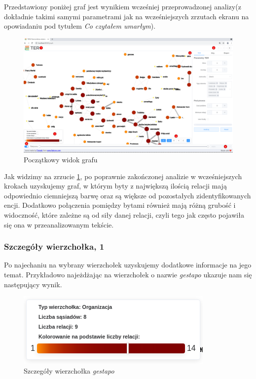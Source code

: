 \documentclass[12pt, a4paper]{article}
\begin{document}
Przedstawiony poniżej graf jest wynikiem wcześniej przeprowadzonej analizy(z dokładnie takimi samymi parametrami jak na wcześniejszych zrzutach ekranu na opowiadaniu pod tytułem \textit{Co czytałem umarłym}).

\begin{figure}[H]
    \centering
    \includegraphics[width=\linewidth]{images/graf-main.png}
    \caption{Początkowy widok grafu}
    \label{graf-main}
\end{figure}

Jak widzimy na zrzucie \ref{graf-main}, po poprawnie zakończonej analizie w wcześniejszych krokach uzyskujemy graf, w którym byty z największą ilością relacji mają odpowiednio ciemniejszą barwę oraz są większe od pozostałych zidentyfikowanych encji. Dodatkowo połączenia pomiędzy bytami również mają różną grubość i widoczność, które zależne są od siły danej relacji, czyli tego jak często pojawiła się ona w przeanalizowanym tekście.\\

\subsubsection{Szczegóły wierzchołka, 1}

Po najechaniu na wybrany wierzchołek uzyskujemy dodatkowe informacje na jego temat. Przykładowo najeżdżając na wierzchołek o nazwie \textit{gestapo} ukazuje nam się następujący wynik.

\begin{figure}[H]
    \centering
    \includegraphics[width=\linewidth]{images/graph-gestapo.png}
    \caption{Szczegóły wierzchołka \textit{gestapo}}
\end{figure}
\end{document}
